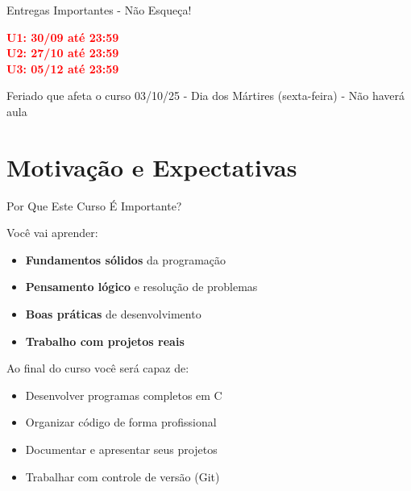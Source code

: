 \documentclass[10pt]{beamer}
\begin{document}
\begin{frame}{Entregas Importantes - Não Esqueça!}
	\begin{center}
		\Large
		\textcolor{red}{\textbf{U1: 30/09 até 23:59}}\\[0.5cm]
		\textcolor{red}{\textbf{U2: 27/10 até 23:59}}\\[0.5cm]
		\textcolor{red}{\textbf{U3: 05/12 até 23:59}}\\[0.5cm]
	\end{center}
	
	\bigskip
	\begin{block}{Feriado que afeta o curso}
		03/10/25 - Dia dos Mártires (sexta-feira) - Não haverá aula
	\end{block}
\end{frame}

\section{Motivação e Expectativas}

\begin{frame}{Por Que Este Curso É Importante?}
	\begin{block}{Você vai aprender:}
		\begin{itemize}
			\item \textbf{Fundamentos sólidos} da programação
			\item \textbf{Pensamento lógico} e resolução de problemas
			\item \textbf{Boas práticas} de desenvolvimento
			\item \textbf{Trabalho com projetos reais}
		\end{itemize}
	\end{block}
	
	\begin{exampleblock}{Ao final do curso você será capaz de:}
		\begin{itemize}
			\item Desenvolver programas completos em C
			\item Organizar código de forma profissional
			\item Documentar e apresentar seus projetos
			\item Trabalhar com controle de versão (Git)
		\end{itemize}
	\end{exampleblock}
\end{frame}
\end{document}
